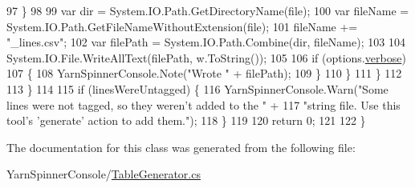 \begin{DoxyCode}
97                         \}
98 
99                         var dir = System.IO.Path.GetDirectoryName(file);
100                         var fileName = System.IO.Path.GetFileNameWithoutExtension(file);
101                         fileName += \textcolor{stringliteral}{"\_lines.csv"};
102                         var filePath = System.IO.Path.Combine(dir, fileName);
103 
104                         System.IO.File.WriteAllText(filePath, w.ToString());
105 
106                         \textcolor{keywordflow}{if} (options.\hyperlink{a00020_ada4d83d1756918f362d55f6649b82b17}{verbose})
107                         \{
108                             YarnSpinnerConsole.Note(\textcolor{stringliteral}{"Wrote "} + filePath);
109                         \}
110                     \}                   
111                 \}
112 
113             \}
114 
115             \textcolor{keywordflow}{if} (linesWereUntagged) \{
116                 YarnSpinnerConsole.Warn(\textcolor{stringliteral}{"Some lines were not tagged, so they weren't added to the "} +
117                                \textcolor{stringliteral}{"string file. Use this tool's 'generate' action to add them."});
118             \}
119 
120             \textcolor{keywordflow}{return} 0;
121 
122         \}
\end{DoxyCode}


The documentation for this class was generated from the following file\-:\begin{DoxyCompactItemize}
\item 
Yarn\-Spinner\-Console/\hyperlink{a00274}{Table\-Generator.\-cs}\end{DoxyCompactItemize}

